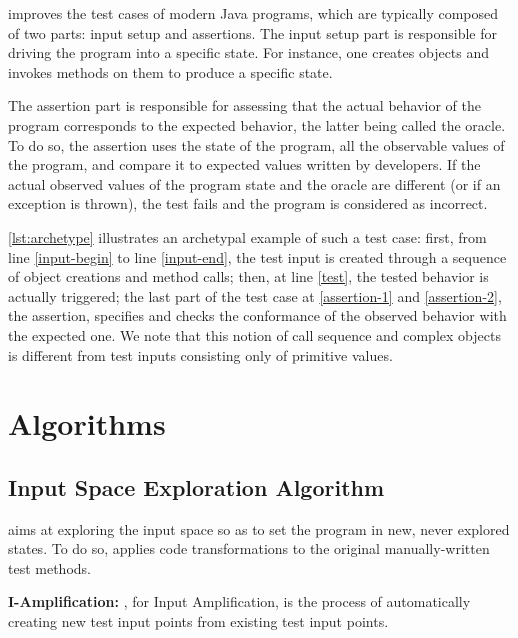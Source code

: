 \dspot improves the test cases of modern Java programs, which are typically composed of two parts: input setup and assertions. 
The input setup part is responsible for driving the program into a specific state.
For instance, one creates objects and invokes methods on them to produce a specific state.

The assertion part is responsible for assessing that the actual behavior of the program corresponds to the expected behavior, the latter being called the oracle.
To do so, the assertion uses the state of the program, \ie all the observable values of the program, and compare it to expected values written by developers.
If the actual observed values of the program state and the oracle are different (or if an exception is thrown), the test fails and the program is considered as incorrect.

\autoref{lst:archetype} illustrates an archetypal example of such a test case: 
first, from line \autoref{input-begin} to line \autoref{input-end}, the test input is created through a sequence of object creations and method calls; 
then, at line \autoref{test}, the tested behavior is actually triggered; 
the last part of the test case at \autoref{assertion-1} and \autoref{assertion-2}, the assertion, specifies and checks the conformance of the observed behavior with the expected one.
We note that this notion of call sequence and complex objects is different from test inputs consisting only of primitive values.

\section{Algorithms}

\subsection{Input Space Exploration Algorithm}
\label{subsec:input-space-exploration}

\dspot aims at exploring the input space so as to set the program in new, never explored states. To do so, \dspot applies code transformations to the original manually-written test methods. 

\textbf{I-Amplification:} \Iampl, for Input Amplification, is the process of automatically creating new test input points from existing test input points.

